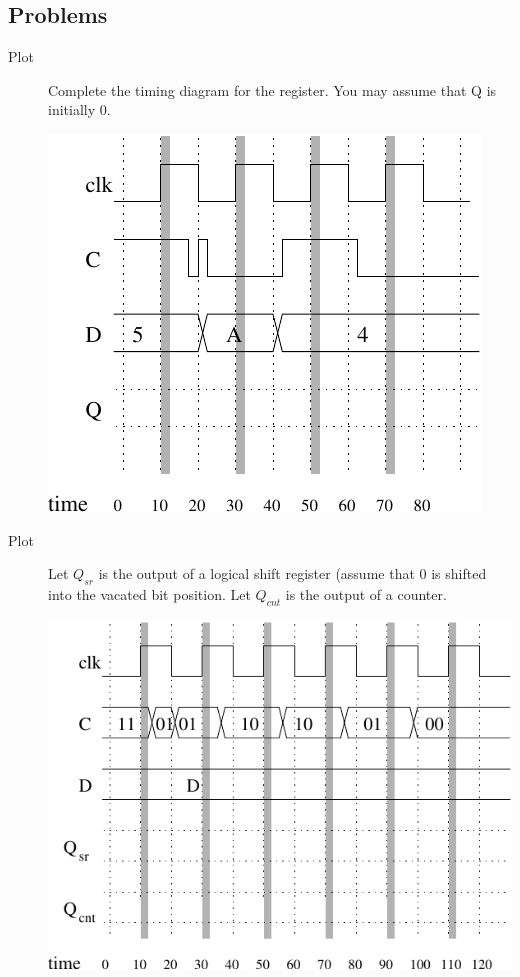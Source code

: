 \subsection{Problems}
\begin{description}

\item[Plot] Complete the timing diagram for the register.
You may assume that Q is initially 0.

\includegraphics{./FigWork/OneBitTime}

\item[Plot] Let 
$Q_{sr}$ is the output of a logical shift register
(assume that 0 is shifted into the vacated bit position.
Let $Q_{cnt}$ is the output of a counter.

\includegraphics{./FigWork/TwoBitTime}
\pagebreak


\end{description}
